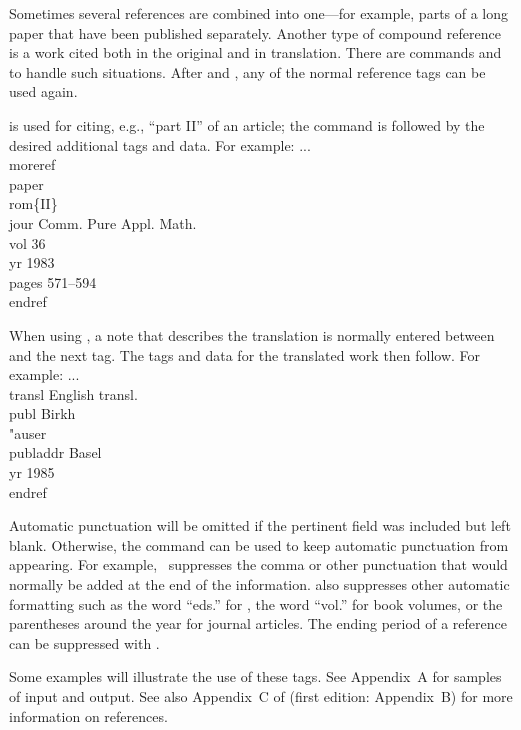 Sometimes several references are combined into one---for example, parts
of a long paper that have been published separately.  Another type of
compound reference is a work cited both in the original and in
translation.  There are commands  and  to handle
such situations.  After  and , any of the normal
reference tags can be used again.

 is used for citing, e.g., ``part II'' of an article; the
 command is followed by the desired additional tags and
data.  For example:
\beginexample{}
...\\moreref\\paper\\rom\{II\}
\\jour Comm. Pure Appl. Math. \\vol 36
\\yr 1983 \\pages 571--594\\endref
\endexample

When using , a note  that describes the translation is
normally entered between  and the next tag. The tags and data
for the translated work then follow. For example: 
\beginexample
...\\transl English transl. \\publ Birkh\\"auser 
\\publaddr Basel \\yr 1985 \\endref
\endexample

Automatic punctuation will be omitted if the pertinent field was
included but left blank.  Otherwise, the command  can be
used to keep automatic punctuation from appearing.  For example,
\ suppresses the comma or other punctuation
that would normally be added at the end of the 
information.  also suppresses other automatic formatting
such as the word ``eds.'' for , the word ``vol.'' for book volumes,
or the parentheses around the year for journal articles. The ending
period of a reference can be suppressed with
.

Some examples will illustrate the use of these tags.  See Appendix~A for
samples of input and output. See also Appendix~C of \JoT{} (first
edition: Appendix~B) for more information on references.



